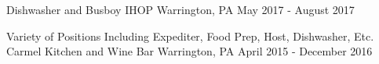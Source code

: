 
\vspace{-2mm}
\begin{cventries}


  \cventrywork
    {Dishwasher and Busboy} %
    {IHOP} %
    {Warrington, PA} %
    {May 2017 - August 2017} %

  \cventrywork
    {Variety of Positions Including Expediter, Food Prep, Host, Dishwasher, Etc. } %
    {Carmel Kitchen and Wine Bar} %
    {Warrington, PA} %
    {April 2015 - December 2016} %
    
  \vspace{-5mm}

\end{cventries}
